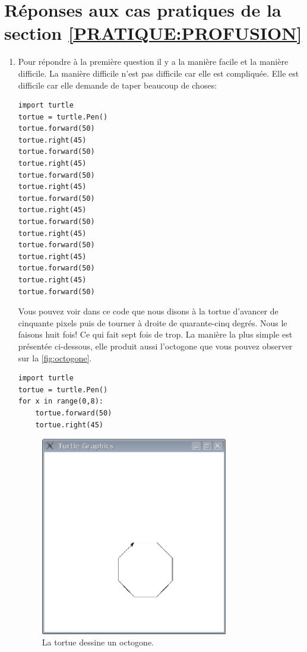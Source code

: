 \section{Réponses aux cas pratiques de la section  \ref{PRATIQUE:PROFUSION}\label{REPONSES:PROFUSION}}
\begin{enumerate}
\item Pour répondre à la première question il y a la manière facile et la manière difficile. La manière difficile n'est pas difficile car elle est compliquée. Elle est difficile car elle demande de taper beaucoup de choses:
\begin{Verbatim}[frame=single,rulecolor=\color{gray}, label=na pas saisir]
import turtle
tortue = turtle.Pen()
tortue.forward(50)
tortue.right(45)
tortue.forward(50)
tortue.right(45)
tortue.forward(50)
tortue.right(45)
tortue.forward(50)
tortue.right(45)
tortue.forward(50)
tortue.right(45)
tortue.forward(50)
tortue.right(45)
tortue.forward(50)
tortue.right(45)
tortue.forward(50)
\end{Verbatim}

Vous pouvez voir dans ce code que nous disons à la tortue d'avancer de cinquante pixels puis de tourner à droite de quarante-cinq degrés. Nous le faisons huit fois! Ce qui fait sept fois de trop. La manière la plus simple est présentée ci-dessous, elle produit aussi l'octogone que vous pouvez observer sur la \autoref{fig:octogone}.
\begin{Verbatim}[frame=single,rulecolor=\color{mbleu}, label=à taper]
import turtle
tortue = turtle.Pen()
for x in range(0,8):
    tortue.forward(50)
    tortue.right(45)
\end{Verbatim}

\begin{figure}
\begin{center}
\includegraphics[width=82mm]{images/octogone.eps}
\end{center}
\caption{La tortue dessine un octogone.}\label{fig:octogone}
\end{figure}


\end{enumerate}
